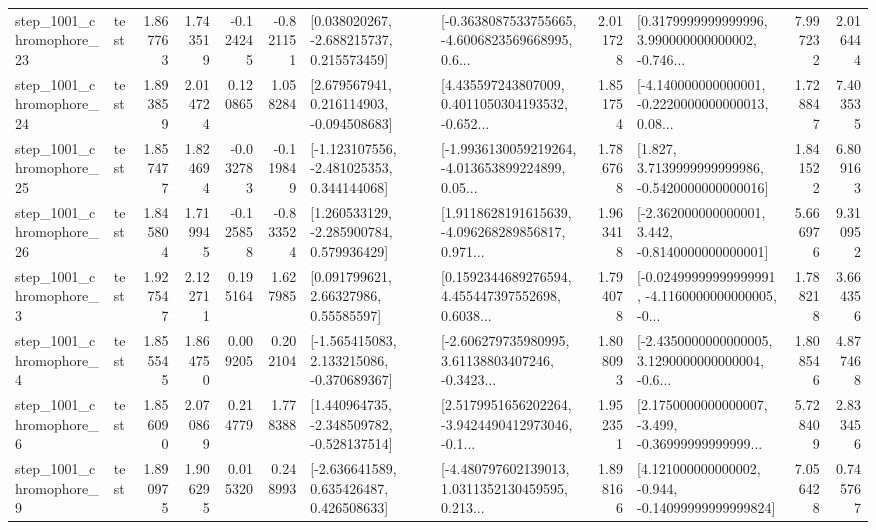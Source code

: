 \begin{tabular}{llrrrrllrlrr}
 step\_1001\_chromophore\_23 &      test &      1.867763 &    1.743519 &     -0.124245 & -0.821151 &    [0.038020267, -2.688215737, 0.215573459] &  [-0.3638087533755665, -4.6006823569668995, 0.6... &       2.011728 &  [0.3179999999999996, 3.990000000000002, -0.746... &            7.997232 &          2.016444 \\
 step\_1001\_chromophore\_24 &      test &      1.893859 &    2.014724 &      0.120865 &  1.058284 &    [2.679567941, 0.216114903, -0.094508683] &  [4.435597243807009, 0.4011050304193532, -0.652... &       1.851754 &  [-4.140000000000001, -0.2220000000000013, 0.08... &            1.728847 &          7.403535 \\
 step\_1001\_chromophore\_25 &      test &      1.857477 &    1.824694 &     -0.032783 & -0.119849 &   [-1.123107556, -2.481025353, 0.344144068] &  [-1.9936130059219264, -4.013653899224899, 0.05... &       1.786768 &   [1.827, 3.7139999999999986, -0.5420000000000016] &            1.841522 &          6.809163 \\
 step\_1001\_chromophore\_26 &      test &      1.845804 &    1.719945 &     -0.125858 & -0.833524 &    [1.260533129, -2.285900784, 0.579936429] &  [1.9118628191615639, -4.096268289856817, 0.971... &       1.963418 &   [-2.362000000000001, 3.442, -0.8140000000000001] &            5.666976 &          9.310952 \\
  step\_1001\_chromophore\_3 &      test &      1.927547 &    2.122711 &      0.195164 &  1.627985 &       [0.091799621, 2.66327986, 0.55585597] &  [0.1592344689276594, 4.455447397552698, 0.6038... &       1.794078 &  [-0.02499999999999991, -4.1160000000000005, -0... &            1.788218 &          3.664356 \\
  step\_1001\_chromophore\_4 &      test &      1.855545 &    1.864750 &      0.009205 &  0.202104 &   [-1.565415083, 2.133215086, -0.370689367] &  [-2.606279735980995, 3.61138803407246, -0.3423... &       1.808093 &  [-2.4350000000000005, 3.1290000000000004, -0.6... &            1.808546 &          4.877468 \\
  step\_1001\_chromophore\_6 &      test &      1.856090 &    2.070869 &      0.214779 &  1.778388 &   [1.440964735, -2.348509782, -0.528137514] &  [2.5179951656202264, -3.9424490412973046, -0.1... &       1.952351 &  [2.1750000000000007, -3.499, -0.36999999999999... &            5.728409 &          2.833456 \\
  step\_1001\_chromophore\_9 &      test &      1.890975 &    1.906295 &      0.015320 &  0.248993 &    [-2.636641589, 0.635426487, 0.426508633] &  [-4.480797602139013, 1.0311352130459595, 0.213... &       1.898166 &  [4.121000000000002, -0.944, -0.14099999999999824] &            7.056428 &          0.745767 \\

\end{tabular}
